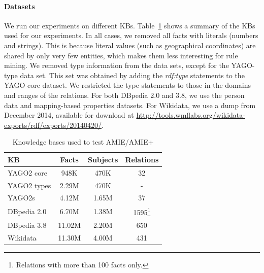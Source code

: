 \paragraph{Datasets} We run our experiments on different KBs. Table~\ref{kbs} shows a summary of the KBs used for our experiments.
In all cases, we removed all facts with literals (numbers and strings).
This is because literal values (such as geographical coordinates) are shared by only very few entities, 
which makes them less interesting for rule mining. 
We removed type information from the data sets, except for the YAGO-type data set.
This set was obtained by adding the \emph{rdf:type} statements to the YAGO core dataset. We restricted the type statements to those in the domains and ranges of the relations. 
For both DBpedia 2.0 and 3.8, we use the person data and mapping-based properties datasets. 
For Wikidata, we use a dump from December 2014, available for download at \url{http://tools.wmflabs.org/wikidata-exports/rdf/exports/20140420/}.

\begin{savenotes}
\begin{table}
\footnotesize
\begin{tabular}{l|c|c|c}
KB & Facts & Subjects & Relations\\
\hline
YAGO2 core  & 948K & 470K & 32\\
YAGO2 types  & 2.29M & 470K & -\\
YAGO2s & 4.12M  & 1.65M & 37\\
DBpedia 2.0 & 6.70M & 1.38M & 1595\footnote{Relations with more than 100 facts only.} \\
DBpedia 3.8 & 11.02M & 2.20M & 650 \\
Wikidata & 11.30M & 4.00M & 431
\end{tabular}
\caption{Knowledge bases used to test AMIE/AMIE+}
\label{kbs}
\end{table}
\end{savenotes}

